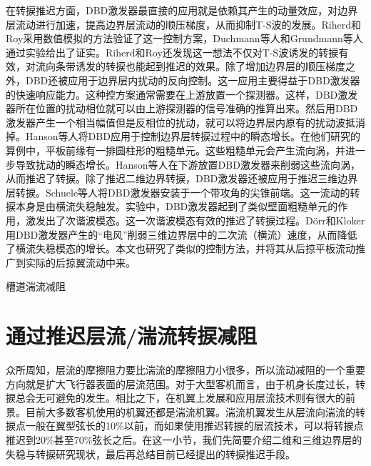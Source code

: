 在转捩推迟方面，DBD激发器最直接的应用就是依赖其产生的动量效应，对边界层流动进行加速，提高边界层流动的顺压梯度，从而抑制T-S波的发展。Riherd和Roy\cite{Riherd2013}采用数值模拟的方法验证了这一控制方案，Duchmann等人\cite{Duchmann2014,Grundmann2007a}和Grundmann等人\cite{Grundmann2007a}通过实验给出了证实。Riherd和Roy\cite{Riherd2014}还发现这一想法不仅对T-S波诱发的转捩有效，对流向条带诱发的转捩也能起到推迟的效果。除了增加边界层的顺压梯度之外，DBD还被应用于边界层内扰动的反向控制\cite{Grundmann2008,Kurz2014,Kotsonis2013}。这一应用主要得益于DBD激发器的快速响应能力。这种控方案通常需要在上游放置一个探测器。这样，DBD激发器所在位置的扰动相位就可以由上游探测器的信号准确的推算出来。然后用DBD激发器产生一个相当幅值但是反相位的扰动，就可以将边界层内原有的扰动波抵消掉。Hanson等人\cite{Hanson2010,Hanson2014}将DBD应用于控制边界层转捩过程中的瞬态增长。在他们研究的算例中，平板前缘有一排圆柱形的粗糙单元。这些粗糙单元会产生流向涡，并进一步导致扰动的瞬态增长。Hanson等人在下游放置DBD激发器来削弱这些流向涡，从而推迟了转捩。除了推迟二维边界转捩，DBD激发器还被应用于推迟三维边界层转捩。Schuele等人\cite{schuele2013control}将DBD激发器安装于一个带攻角的尖锥前端。这一流动的转捩本身是由横流失稳触发。实验中，DBD激发器起到了类似壁面粗糙单元的作用，激发出了次谐波模态。这一次谐波模态有效的推迟了转捩过程。D\"orr和Kloker\cite{dorr2016}用DBD激发器产生的“电风”削弱三维边界层中的二次流（横流）速度，从而降低了横流失稳模态的增长。本文也研究了类似的控制方法，并将其从后掠平板流动推广到实际的后掠翼流动中来。

槽道湍流减阻\cite{LiZX2015}
\section{通过推迟层流/湍流转捩减阻}
\label{sec:first}
众所周知，层流的摩擦阻力要比湍流的摩擦阻力小很多，所以流动减阻的一个重要方向就是扩大飞行器表面的层流范围。对于大型客机而言，由于机身长度过长，转捩总会无可避免的发生。相比之下，在机翼上发展和应用层流技术则有很大的前景。目前大多数客机使用的机翼还都是湍流机翼。湍流机翼发生从层流向湍流的转捩点一般在翼型弦长的10\%以前，而如果使用推迟转捩的层流技术，可以将转捩点推迟到20\%甚至70\%弦长之后。在这一小节，我们先简要介绍二维和三维边界层的失稳与转捩研究现状，最后再总结目前已经提出的转捩推迟手段。

